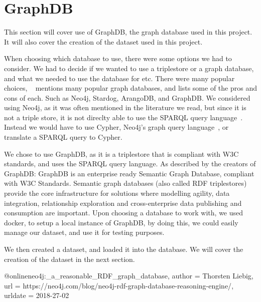 \section{GraphDB}
This section will cover use of GraphDB, the graph database used in this project. It will also cover the creation of the dataset used in this project.

When choosing which database to use, there were some options we had to consider. We had to decide if we wanted to use a triplestore or a graph database, and what we needed to use the database for etc. There were many popular choices, ~\cite{best_graph_databases} mentions many popular graph databases, and lists some of the pros and cons of each. Such as Neo4j, Stardog, ArangoDB, and GraphDB. We considered using Neo4j, as it was often mentioned in the literature we read, but since it is not a triple store, it is not direclty able to use the SPARQL query language~\cite{neo4j:_a_reasonable_RDF_graph_database}. Instead we would have to use Cypher, Neo4j's graph query language~\cite{cypher_query_language}, or translate a SPARQL query to Cypher.


We chose to use GraphDB, as it is a triplestore that is compliant with W3C standards, and uses the SPARQL query language. As described by the creators of GraphDB: \cite{graphDB}{GraphDB is an enterprise ready Semantic Graph Database, compliant with W3C Standards. Semantic graph databases (also called RDF triplestores) provide the core infrastructure for solutions where modelling agility, data integration, relationship exploration and cross-enterprise data publishing and consumption are important.}
Upon choosing a database to work with, we used docker, to setup a local instance of GraphDB, by doing this, we could easily manage our dataset, and use it for testing purposes.

We then created a dataset, and loaded it into the database. We will cover the creation of the dataset in the next section.



@online{neo4j:_a_reasonable_RDF_graph_database,
    author  = {Thorsten Liebig},
    url     = {https://neo4j.com/blog/neo4j-rdf-graph-database-reasoning-engine/},
    urldate = {2018-27-02}
}